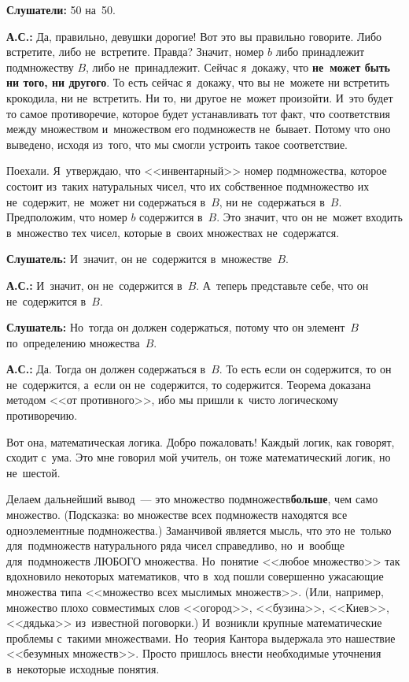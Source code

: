 \textbf{Слушатели:} 50 на~50.

\textbf{А.С.:} Да, правильно, девушки дорогие! Вот это вы правильно говорите. Либо встретите, либо
не~встретите. Правда? Значит, номер $b$ либо принадлежит подмножеству $B$, либо не~принадлежит. Сейчас
я~докажу, что \textbf{не~может быть ни того, ни другого}. То есть сейчас я~докажу, что вы не~можете ни
встретить крокодила, ни не~встретить. Ни то, ни другое не~может произойти. И~это будет то самое
противоречие, которое будет устанавливать тот факт, что соответствия между множеством и~множеством
его подмножеств не~бывает. Потому что оно выведено, исходя из~того, что мы смогли устроить такое соответствие.

Поехали. Я~утверждаю, что <<инвентарный>> номер подмножества, которое состоит из~таких натуральных
чисел, что их собственное подмножество их не~содержит, не~может ни содержаться в~$B$, ни
не~содержаться в~$B$. Предположим, что номер $b$ содержится в~$B$. Это значит, что он не~может входить
в~множество тех чисел, которые в~своих множествах не~содержатся.

\textbf{Слушатель:} И~значит, он не~содержится в~множестве~$B$.

\textbf{А.С.:} И~значит, он не~содержится в~$B$. А~теперь представьте себе, что он не~содержится в~$B$.

\textbf{Слушатель:} Но~тогда он должен содержаться, потому что он элемент~$B$ по~определению множества~$B$.

\textbf{А.С.:} Да. Тогда он должен содержаться в~$B$. То есть если он содержится, то он
не~содержится, а~если он не~содержится, то содержится. Теорема доказана методом <<от противного>>,
ибо мы пришли к~чисто логическому противоречию.

Вот она, математическая логика. Добро пожаловать! Каждый  логик, как говорят, сходит
с~ума. Это мне говорил мой учитель, он тоже математический логик, но не~шестой.

Делаем дальнейший вывод~--- это множество подмножеств\linebreak \textbf{больше}, чем само
множество. (Подсказка: во множестве всех подмножеств находятся все одноэлементные подмножества.)
Заманчивой является мысль, что это не~только для~подмножеств натурального ряда чисел справедливо,
но~и~вообще для~подмножеств ЛЮБОГО множества. Но~понятие <<любое множество>> так вдохновило
некоторых математиков, что в~ход пошли совершенно ужасающие множества типа <<множество всех
мыслимых множеств>>. (Или, например, множество плохо совместимых слов <<огород>>, <<бузина>>,
<<Киев>>, <<дядька>> из~известной поговорки.) И~возникли крупные математические проблемы с~такими
множествами. Но~теория Кантора выдержала это нашествие <<безумных множеств>>. Просто пришлось
внести необходимые уточнения в~некоторые исходные понятия.


